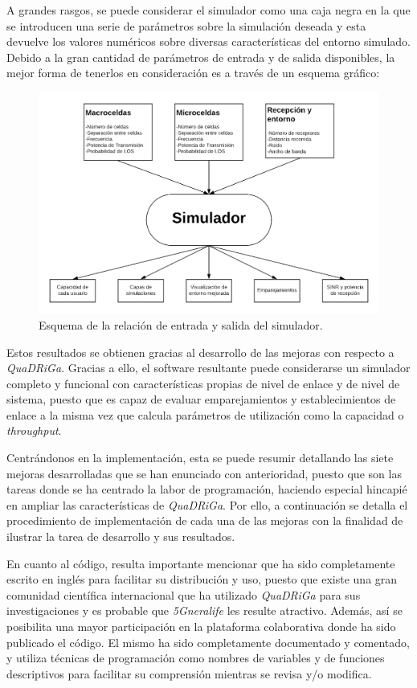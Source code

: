 A grandes rasgos, se puede considerar el simulador como una caja negra en la que se introducen una serie de parámetros sobre la simulación deseada y esta devuelve los valores numéricos sobre diversas características del entorno simulado. Debido a la gran cantidad de parámetros de entrada y de salida disponibles, la mejor forma de tenerlos en consideración es a través de un esquema gráfico:

\begin{figure}[h!]
	\centering
    \includegraphics[width=\linewidth]{imagenes/cajanegra_simulador.png}
	\caption{Esquema de la relación de entrada y salida del simulador.}
	\label{fig:cajanegra}
\end{figure}

Estos resultados se obtienen gracias al desarrollo de las mejoras con respecto a \textit{QuaDRiGa}. Gracias a ello, el software resultante puede considerarse un simulador completo y funcional con características propias de nivel de enlace y de nivel de sistema, puesto que es capaz de evaluar emparejamientos y establecimientos de enlace a la misma vez que calcula parámetros de utilización como la capacidad o \textit{throughput}.

Centrándonos en la implementación, esta se puede resumir detallando las siete mejoras desarrolladas que se han enunciado con anterioridad, puesto que son las tareas donde se ha centrado la labor de programación, haciendo especial hincapié en ampliar las características de \textit{QuaDRiGa}. Por ello, a continuación se detalla el procedimiento de implementación de cada una de las mejoras con la finalidad de ilustrar la tarea de desarrollo y sus resultados. 

En cuanto al código, resulta importante mencionar que ha sido completamente escrito en inglés para facilitar su distribución y uso, puesto que existe una gran comunidad científica internacional que ha utilizado \textit{QuaDRiGa} para sus investigaciones y es probable que \textit{5Gneralife} les resulte atractivo. Además, así se posibilita una mayor participación en la plataforma colaborativa donde ha sido publicado el código. El mismo ha sido completamente documentado y comentado, y utiliza técnicas de programación como nombres de variables y de funciones descriptivos para facilitar su comprensión mientras se revisa y/o modifica.

